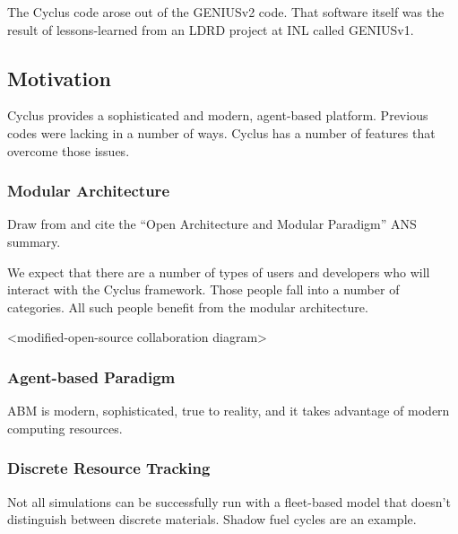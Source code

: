The Cyclus code arose out of the GENIUSv2 code. That software itself was the 
result of lessons-learned from an LDRD project at INL called GENIUSv1. 


\subsection{Motivation}

Cyclus provides a sophisticated and modern, agent-based platform. Previous 
codes were lacking in a number of ways. Cyclus has a number of features that 
overcome those issues.  

\subsubsection{Modular Architecture}

Draw from and cite the ``Open Architecture and Modular Paradigm'' ANS summary.

We expect that there are a number of types of users and developers who will 
interact with the Cyclus framework. Those people fall into a number of 
categories. All such people benefit from the modular architecture. 

<modified-open-source collaboration diagram>

\subsubsection{Agent-based Paradigm}

ABM is modern, sophisticated, true to reality, and it takes advantage of modern 
computing resources. 


\subsubsection{Discrete Resource Tracking}

Not all simulations can be successfully run with a fleet-based model that 
doesn't distinguish between discrete materials. Shadow fuel cycles are an 
example. 

